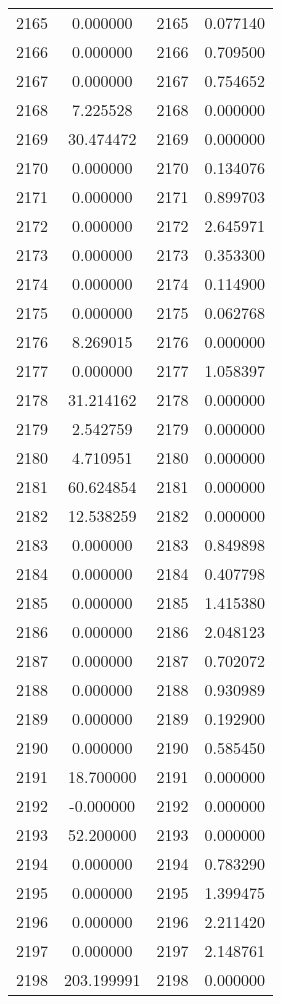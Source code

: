 \documentclass[12pt]{article}
\begin{document}
\begin{longtable}{@{}cccc@{}}
2165 & 0.000000 & 2165 & 0.077140 \\
2166 & 0.000000 & 2166 & 0.709500 \\
2167 & 0.000000 & 2167 & 0.754652 \\
2168 & 7.225528 & 2168 & 0.000000 \\
2169 & 30.474472 & 2169 & 0.000000 \\
2170 & 0.000000 & 2170 & 0.134076 \\
2171 & 0.000000 & 2171 & 0.899703 \\
2172 & 0.000000 & 2172 & 2.645971 \\
2173 & 0.000000 & 2173 & 0.353300 \\
2174 & 0.000000 & 2174 & 0.114900 \\
2175 & 0.000000 & 2175 & 0.062768 \\
2176 & 8.269015 & 2176 & 0.000000 \\
2177 & 0.000000 & 2177 & 1.058397 \\
2178 & 31.214162 & 2178 & 0.000000 \\
2179 & 2.542759 & 2179 & 0.000000 \\
2180 & 4.710951 & 2180 & 0.000000 \\
2181 & 60.624854 & 2181 & 0.000000 \\
2182 & 12.538259 & 2182 & 0.000000 \\
2183 & 0.000000 & 2183 & 0.849898 \\
2184 & 0.000000 & 2184 & 0.407798 \\
2185 & 0.000000 & 2185 & 1.415380 \\
2186 & 0.000000 & 2186 & 2.048123 \\
2187 & 0.000000 & 2187 & 0.702072 \\
2188 & 0.000000 & 2188 & 0.930989 \\
2189 & 0.000000 & 2189 & 0.192900 \\
2190 & 0.000000 & 2190 & 0.585450 \\
2191 & 18.700000 & 2191 & 0.000000 \\
2192 & -0.000000 & 2192 & 0.000000 \\
2193 & 52.200000 & 2193 & 0.000000 \\
2194 & 0.000000 & 2194 & 0.783290 \\
2195 & 0.000000 & 2195 & 1.399475 \\
2196 & 0.000000 & 2196 & 2.211420 \\
2197 & 0.000000 & 2197 & 2.148761 \\
2198 & 203.199991 & 2198 & 0.000000 \\

\end{longtable}
\end{document}
